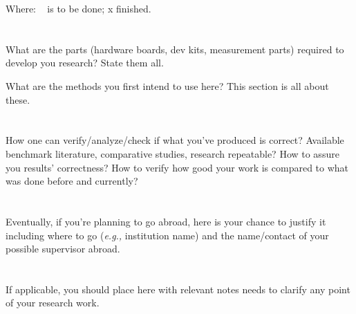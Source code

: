 \documentclass[12pt, a4paper]{article}
\begin{document}
Where: \ck~ is to be done; x  finished.


\section{\sectionVI}
\label{sec:parts-methods}
What are the parts (hardware boards, dev kits, measurement parts) required to develop you research? State them all.

What are the methods you first intend to use here? This section is all about these.


\section{\sectionVII}
\label{sec:result-analysis}
How one can verify/analyze/check if what you've produced is correct? Available benchmark literature, comparative studies, research repeatable? How to assure you results' correctness? How to verify how good your work is compared to what was done before and currently?


\section{\sectionVIII}
\label{sec:abroad-internship}
Eventually, if you're planning to go abroad, here is your chance to justify it including where to go (\textit{e.g.,} institution name) and the name/contact of your possible supervisor abroad.


\section{\sectionIX}
\label{sec:general-notes}
If applicable, you should place here with relevant notes needs to clarify any point of your research work.





\listoftodos
\end{document}
